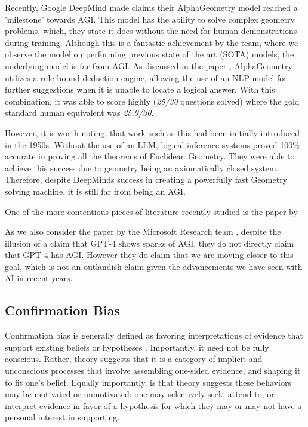 \documentclass{article}
\theoremstyle{plain}
\theoremstyle{definition}
\theoremstyle{remark}
\begin{document}
Recently, Google DeepMind made claims their AlphaGeometry model reached a 'milestone' towards AGI. This model has the ability to solve complex geometry problems, which, they state it does without the need for human demonstrations during training. Although this is a fantastic achievement by the team, where we observe the model outperforming previous state of the art (SOTA) models, the underlying model is far from AGI. As discussed in the paper \cite{}, AlphaGeometry utilizes a rule-bound deduction engine, allowing the use of an NLP model for further suggestions when it is unable to locate a logical answer. With this combination, it was able to score highly (\textit{25/30} questions solved) where the gold standard human equivalent was \textit{25.9/30}.

However, it is worth noting, that work such as this had been initially introduced in the 1950s. Without the use of an LLM, logical inference systems proved 100\% accurate in proving all the theorems of Euclidean Geometry. They were able to achieve this success due to geometry being an axiomatically closed system. Therefore, despite DeepMinds success in creating a powerfully fast Geometry solving machine, it is still far from being an AGI.

One of the more contentious pieces of literature recently studied is the paper by \cite{gurnee2023language}

As we also consider the paper by the Microsoft Research team \cite{}, despite the illusion of a claim that GPT-4 shows sparks of AGI, they do not directly claim that GPT-4 has AGI. However they do claim that we are moving closer to this goal, which is not an outlandish claim given the advancements we have seen with AI in recent years.

\subsection{Confirmation Bias}

Confirmation bias is generally defined as favoring interpretations of evidence that support existing beliefs or hypotheses \cite{nickerson1998confirmation}. Importantly, it need not be fully conscious. Rather, theory suggests that it is a category of implicit and unconscious processes that involve assembling one-sided evidence, and shaping it to fit one's belief. Equally importantly, is that theory suggests these behaviors may be motivated or unmotivated: one may selectively seek, attend to, or interpret evidence in favor of a hypothesis for which they may or may not have a personal interest in supporting. 
\end{document}
